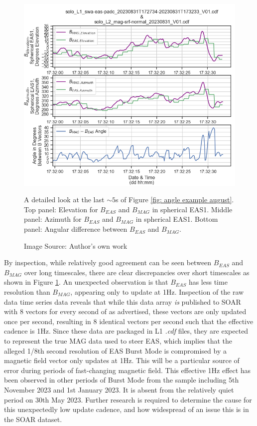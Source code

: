 \begin{figure}[h!]
    \centering
    \centerfloat
    \includegraphics[width=1.05\linewidth]{figures/Angle Example Detail.png}
    \caption{A detailed look at the last \(\sim5\)s of Figure \ref{fig: angle example august}. Top panel: Elevation for \(B_{EAS}\) and \(B_{MAG}\) in spherical EAS1. Middle panel: Azimuth for \(B_{EAS}\) and \(B_{MAG}\) in spherical EAS1. Bottom panel: Angular difference between \(B_{EAS}\) and \(B_{MAG}\).}
    \caption*{Image Source: Author's own work}
    \label{fig: angle example detail august}
\end{figure}

By inspection, while relatively good agreement can be seen between \(B_{EAS}\) and \(B_{MAG}\) over long timescales, there are clear discrepancies over short timescales as shown in Figure \ref{fig: angle example detail august}. An unexpected observation is that \(B_{EAS}\) has less time resolution than \(B_{MAG}\), appearing only to update at 1Hz. Inspection of the raw  data time series data reveals that while this data array \textit{is} published to SOAR with 8 vectors for every second of  as advertised, these vectors are only updated once per second, resulting in 8 identical vectors per second such that the effective cadence is 1Hz. Since these data are packaged in L1 \textit{.cdf} files, they are expected to represent the true MAG data used to steer EAS, which implies that the alleged 1/8th second resolution of EAS Burst Mode is compromised by a magnetic field vector only updates at 1Hz. This will be a particular source of error during periods of fast-changing magnetic field. This effective 1Hz effect has been observed in other periods of Burst Mode from the sample including 5th November 2023 and 1st January 2023. It is absent from the relatively quiet period on 30th May 2023. Further research is required to determine the cause for this unexpectedly low update cadence, and how widespread of an issue this is in the SOAR dataset.
\\

